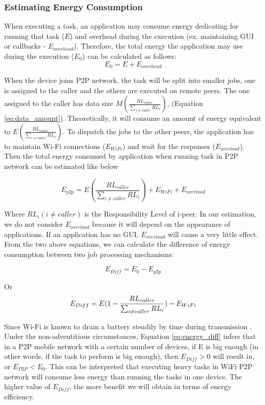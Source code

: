 \documentclass{sig-alternate}
\begin{document}
\subsubsection{Estimating Energy Consumption}
When executing a task, an application may consume energy dedicating for running that task ($E$) and overhead during the execution (ex. maintaining GUI or callbacks - $E_{overhead}$). Therefore, the total energy the application may use during the execution ($E_{0}$) can be calculated as follows:
$$E_{0} = E + E_{overhead}$$

When the device joins P2P network, the task will be split into smaller jobs, one is assigned to the caller and the others are executed on remote peers. The one assigned to the caller has data size $M(\frac{RL_{caller}}{\sum_{j \neq caller}{RL_{i}}})$, (Equation \ref{eq:data_amount}). Theoretically, it will consume an amount of energy equivalent to $E(\frac{RL_{caller}}{\sum_{i \neq caller}{RL_{i}}})$. To dispatch the jobs to the other peers, the application has to maintain Wi-Fi connections ($E_{WiFi}$) and wait for the responses ($E_{overload}$). Then the total energy consumed by application when running task in P2P network can be estimated like below

\begin{small} $$E_{p2p} = E(\frac{RL_{caller}}{\sum_{i \neq caller}{RL_{i}}}) + E_{WiFi} + E_{overload}$$  \end{small}

Where $RL_{i} (i \neq caller)$ is the Responsibility Level of i-peer. In our estimation, we do not consider $E_{overload}$ because it will depend on the appearance of applications. If an application has no GUI, $E_{overload}$ will cause a very little effect. From the two above equations, we can calculate the difference of energy consumption between two job processing mechanisms:

\begin{small} $$E_{Diff} = E_{0} - E_{p2p}$$ \end{small} Or 
\begin{equation}
\label{eq:energy_diff} \small
E_{Diff} = E(1 - \frac{RL_{caller}}{\sum_{i \neq caller}{RL_{i}}}) - E_{WiFi}
\end{equation}

Since Wi-Fi is known to drain a battery steadily by time during transmission \cite{wifi_energy}. Under the non-adventitious circumstances, Equation \ref{eq:energy_diff} infers that in a P2P mobile network with a certain number of devices, if E is big enough (in other words, if the task to perform is big enough), then $E_{Diff} > 0$ will result in, or $E_{P2P} < E_{0}$. This can be interpreted that executing heavy tasks in WiFi P2P network will consume less energy than running the tasks in one device. The higher value of $E_{Diff}$, the more benefit we will obtain in terms of energy efficiency.
\end{document}
